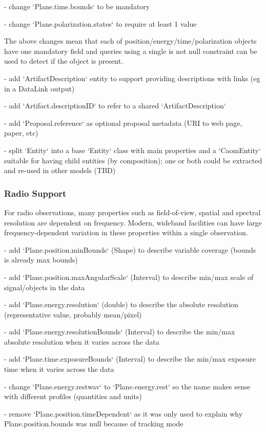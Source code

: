 \documentclass[11pt,a4paper]{ivoa}
\begin{document}
- change `Plane.time.bounds` to be mandatory

- change `Plane.polarization.states` to require at least 1 value

The above changes mean that each of position/energy/time/polarization objects 
have one mandatory field and queries using a single is not null constraint
can be used to detect if the object is present.

- add `ArtifactDescription` entity to support providing descriptions with links 
(eg in a DataLink output)

- add `Artifact.descriptionID` to refer to a shared `ArtifactDescription`

- add `Proposal.reference` as optional proposal metadata (URI to web page, paper, etc)

- split `Entity` into a base `Entity` class with main properties and a `CaomEntity` 
suitable for having child entities (by composition); one or both could be extracted 
and re-used in other models (TBD)

\subsubsection{Radio Support}

For radio observations, many properties such as field-of-view, spatial and spectral resolution are dependent on frequency. Modern,
 wideband facilities can have large frequency-dependent variation in these properties within a single observation.

- add `Plane.position.minBounds` (Shape) to describe variable coverage (bounds is already max bounds)

- add `Plane.position.maxAngularScale` (Interval) to describe min/max scale of signal/objects in the data

- add `Plane.energy.resolution` (double) to describe the absolute resolution (representative value, probably mean/pixel)

- add `Plane.energy.resolutionBounds` (Interval) to describe the min/max absolute resolution when it varies across the data

- add `Plane.time.exposureBounds` (Interval) to describe the min/max exposure time when it varies across the data

- change `Plane.energy.restwav` to `Plane.energy.rest` so the name makes sense with different profiles (quantities and units)

- remove `Plane.position.timeDependent` as it was only used to explain why Plane.position.bounds was null because of tracking mode
\end{document}

